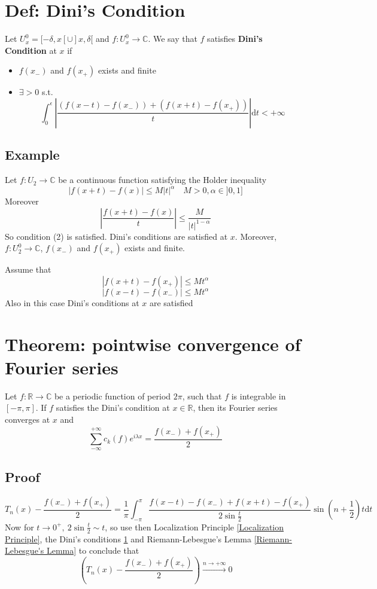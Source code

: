 \documentclass{book}
\newcommand{\abs}[1]{\left\lvert #1 \right\rvert}
\newcommand{\leftbracket}{[}
\newcommand{\rightbracket}{]}
\begin{document}
\section{Def: Dini's Condition}\label{Dini's conditions}
Let $U_x^0=\leftbracket-\delta,x\leftbracket\cup\rightbracket x,\delta\leftbracket$ and $f:U_x^0\rightarrow \mathbb{C}$. We say that $f$ satisfies \textbf{Dini's Condition} at $x$ if \begin{itemize}
    \item $f(x_-)$ and $f(x_+)$ exists and finite
    \item $\exists>0$ s.t. $$\int_0^\epsilon\abs{\frac{(f(x-t)-f(x_-))+(f(x+t)-f(x_+))}t}\text{d}t<+\infty$$ 
\end{itemize}
\subsection*{Example}Let $f:U_2\rightarrow \mathbb{C}$ be a continuous function satisfying the Holder inequality$$\abs{f(x+t)-f(x)}\leq M\abs t ^\alpha\quad M>0,\alpha\in \rightbracket 0,1\rightbracket$$
Moreover
$$\abs{\frac{f(x+t)-f(x)}t}\leq\frac{M}{\abs t ^{1-\alpha}}$$
So condition (2) is satisfied. Dini's conditions are satisfied at $x$. Moreover, $f:U_2^0\rightarrow \mathbb{C}$, $f(x_-)$ and $f(x_+)$ exists and finite.

Assume that $$\abs{f(x+t)-f(x_+)}\leq Mt^\alpha$$$$\abs{f(x-t)-f(x_-)}\leq Mt^\alpha$$
Also in this case Dini's conditions at $x$ are satisfied
\section{Theorem: pointwise convergence of Fourier series}
Let $f:\mathbb{R}\rightarrow\mathbb{C}$ be a periodic function of period $2\pi$, such that $f$ is integrable in $[-\pi,\pi]$. If $f$ satisfies the Dini's condition at $x\in \mathbb{R}$, then its Fourier series converges at $x$ and $$\sum\limits_{-\infty}^{+\infty}c_k(f)e^{i\lambda x}=\frac{f(x_-)+f(x_+)}{2}$$
\subsection*{Proof}
$$T_n(x)-\frac{f(x_-)+f(x_+)}{2}=\frac{1}\pi\int_{-\pi}^\pi\frac{f(x-t)-f(x_-)+f(x+t)-f(x_+)}{2\sin\frac{t}2}\sin(n+\frac{1}2)t\text{d}t$$
Now for $t\rightarrow 0^+,\ 2\sin\frac{t}2\sim t$, so use then Localization Principle \ref{Localization Principle}, the Dini's conditions \ref{Dini's conditions} and Riemann-Lebesgue's Lemma \ref{Riemann-Lebesgue's Lemma} to conclude that$$\left(T_n(x)-\frac{f(x_-)+f(x_+)}{2}\right)\stackrel{n\rightarrow +\infty}\rightarrow 0$$
\end{document}
